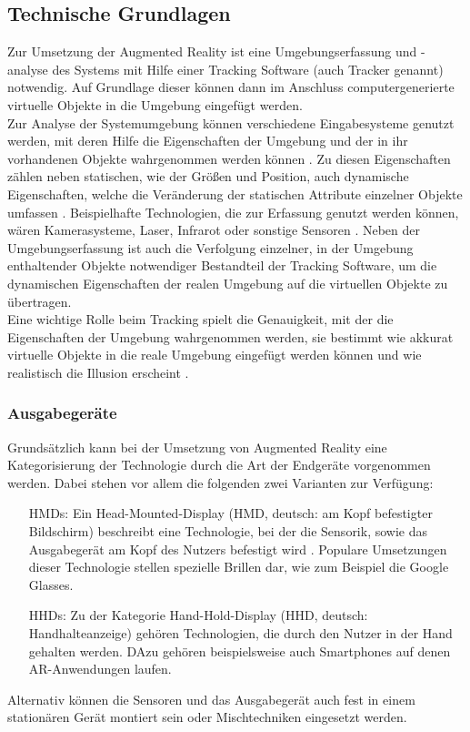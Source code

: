 \subsection{Technische Grundlagen}
Zur Umsetzung der Augmented Reality ist eine Umgebungserfassung und -analyse des Systems mit Hilfe einer Tracking Software (auch Tracker genannt) notwendig. Auf Grundlage dieser können dann im Anschluss computergenerierte virtuelle Objekte in die Umgebung eingefügt werden. \\
Zur Analyse der Systemumgebung können verschiedene Eingabesysteme genutzt werden, mit deren Hilfe die Eigenschaften der Umgebung und der in ihr vorhandenen Objekte wahrgenommen werden können \citep[S. 22]{tab:augmented-reality}. Zu diesen Eigenschaften zählen neben statischen, wie der Größen und Position, auch dynamische Eigenschaften, welche die Veränderung der statischen Attribute einzelner Objekte umfassen . Beispielhafte Technologien, die zur Erfassung genutzt werden können, wären Kamerasysteme, Laser, Infrarot oder sonstige Sensoren \citep[S. 22]{tab:augmented-reality}.
Neben der Umgebungserfassung ist auch die Verfolgung einzelner, in der Umgebung enthaltender Objekte notwendiger Bestandteil der Tracking Software, um die dynamischen Eigenschaften der realen Umgebung auf die virtuellen Objekte zu übertragen.\\
Eine wichtige Rolle beim Tracking spielt die Genauigkeit, mit der die Eigenschaften der Umgebung wahrgenommen werden, sie bestimmt wie akkurat virtuelle Objekte in die reale Umgebung eingefügt werden können und wie realistisch die Illusion erscheint \citep[S. 2]{klein:visual-tracking}.

\subsubsection{Ausgabegeräte}
Grundsätzlich kann bei der Umsetzung von Augmented Reality eine Kategorisierung der Technologie durch die Art der Endgeräte vorgenommen werden. Dabei stehen vor allem die folgenden zwei Varianten zur Verfügung:
\begin{itemize}
\item[HMDs:] Ein Head-Mounted-Display (HMD, deutsch: \glqq am Kopf befestigter Bildschirm\grqq) beschreibt eine Technologie, bei der die Sensorik, sowie das Ausgabegerät am Kopf des Nutzers befestigt wird \citep[S. 44]{mehler-bicher:augmented-reality}. Populare Umsetzungen dieser Technologie stellen spezielle Brillen dar, wie zum Beispiel die Google Glasses.
\item[HHDs:] Zu der Kategorie Hand-Hold-Display (HHD, deutsch: \glqq Handhalteanzeige\grqq) gehören Technologien, die durch den Nutzer in der Hand gehalten werden. DAzu gehören beispielsweise auch Smartphones auf denen AR-Anwendungen laufen.
\end{itemize}
Alternativ können die Sensoren und das Ausgabegerät auch fest in einem stationären Gerät montiert sein \citep[S. 27]{mehler-bicher:augmented-reality} oder Mischtechniken eingesetzt werden.

